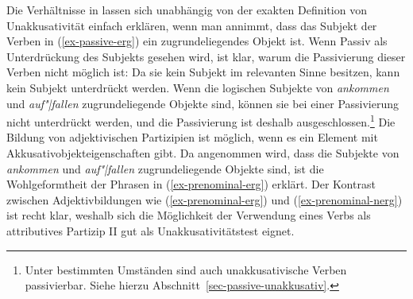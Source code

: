 Die Verhältnisse in  lassen sich unabhängig von
der exakten Definition von Unakkusativität einfach erklären, wenn man annimmt,
dass das Subjekt der Verben in (\ref{ex-passive-erg}) ein zugrundeliegendes Objekt ist.
Wenn Passiv als Unterdrückung des Subjekts gesehen wird, ist klar, warum die Passivierung dieser
Verben nicht möglich ist: Da sie kein Subjekt im relevanten Sinne besitzen, kann kein Subjekt
unterdrückt werden. Wenn die logischen Subjekte von \emph{ankommen} und \emph{auf"|fallen}
zugrundeliegende Objekte sind, können sie bei einer Passivierung nicht unterdrückt werden,
und die Passivierung ist deshalb ausgeschlossen.\footnote{
        Unter bestimmten Umständen sind auch unakkusativische Verben
        passivierbar. Siehe hierzu Abschnitt~\ref{sec-passive-unakkusativ}.
}
Die Bildung von adjektivischen Partizipien ist möglich, wenn es ein Element mit
Akkusativobjekteigenschaften gibt. Da angenommen wird, dass die Subjekte
von \emph{ankommen} und \emph{auf"|fallen} zugrundeliegende Objekte sind,
ist die Wohlgeformtheit der Phrasen in (\ref{ex-prenominal-erg}) erklärt. Der Kontrast zwischen
Adjektivbildungen wie (\ref{ex-prenominal-erg}) und (\ref{ex-prenominal-nerg}) ist recht klar,
weshalb sich die Möglichkeit der Verwendung eines Verbs als attributives Partizip II gut als
Unakkusativitätstest eignet.%


